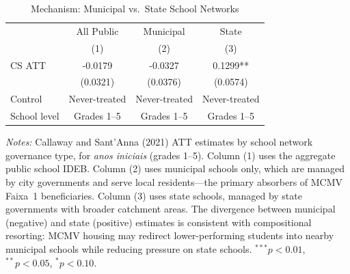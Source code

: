 \begin{table}[t]
\centering
\caption{Mechanism: Municipal vs.\ State School Networks}
\label{tab:mechanism}
\begin{threeparttable}
\begin{tabular}{lccc}
\toprule
 & All Public & Municipal & State \\
 & (1) & (2) & (3) \\
\midrule
CS ATT & -0.0179 & -0.0327 & 0.1299** \\
 & (0.0321) & (0.0376) & (0.0574) \\
\midrule
Control & Never-treated & Never-treated & Never-treated \\
School level & Grades 1--5 & Grades 1--5 & Grades 1--5 \\
\bottomrule
\end{tabular}
\begin{tablenotes}
\item \textit{Notes:} Callaway and Sant'Anna (2021) ATT estimates by school network governance type, for \textit{anos iniciais} (grades 1--5). Column (1) uses the aggregate public school IDEB. Column (2) uses municipal schools only, which are managed by city governments and serve local residents---the primary absorbers of MCMV Faixa~1 beneficiaries. Column (3) uses state schools, managed by state governments with broader catchment areas. The divergence between municipal (negative) and state (positive) estimates is consistent with compositional resorting: MCMV housing may redirect lower-performing students into nearby municipal schools while reducing pressure on state schools. $^{***}p<0.01$, $^{**}p<0.05$, $^{*}p<0.10$.
\end{tablenotes}
\end{threeparttable}
\end{table}
